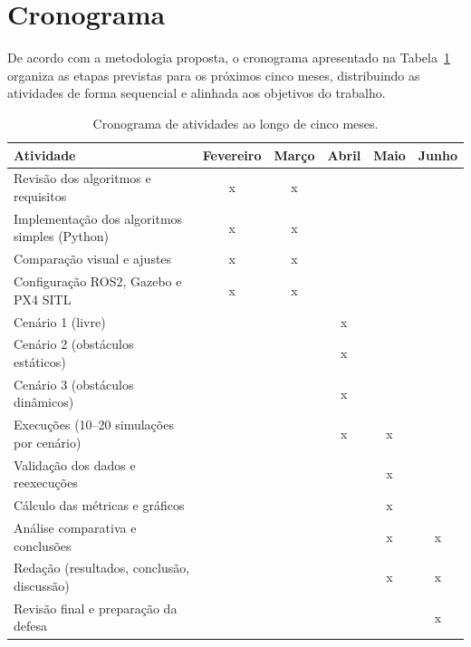 
\section{Cronograma}

De acordo com a metodologia proposta, o cronograma apresentado na Tabela~\ref{tab:cronograma} organiza as etapas previstas para os próximos cinco meses, distribuindo as atividades de forma sequencial e alinhada aos objetivos do trabalho.

\begin{table}[!ht]
\centering
\small %
\caption{Cronograma de atividades ao longo de cinco meses.}
\label{tab:cronograma}
\renewcommand{\arraystretch}{1.2}
\begin{tabular}{|p{6.5cm}|c|c|c|c|c|}
\hline
\textbf{Atividade} & \textbf{Fevereiro} & \textbf{Março} & \textbf{Abril} & \textbf{Maio}  & \textbf{Junho} \\ \hline

Revisão dos algoritmos e requisitos             & x & x &   &   &   \\ \hline
Implementação dos algoritmos simples (Python)   & x & x &   &   &   \\ \hline
Comparação visual e ajustes                     & x & x &   &   &   \\ \hline
Configuração ROS2, Gazebo e PX4 SITL            & x & x &   &   &   \\ \hline
Cenário 1 (livre)                               &   &   & x &   &   \\ \hline
Cenário 2 (obstáculos estáticos)                &   &   & x &   &   \\ \hline
Cenário 3 (obstáculos dinâmicos)                &   &   & x &   &   \\ \hline
Execuções (10--20 simulações por cenário)       &   &   & x & x &   \\ \hline
Validação dos dados e reexecuções               &   &   &   & x &   \\ \hline
Cálculo das métricas e gráficos                 &   &   &   & x &   \\ \hline
Análise comparativa e conclusões                &   &   &   & x & x \\ \hline
Redação (resultados, conclusão, discussão)      &   &   &   & x & x \\ \hline
Revisão final e preparação da defesa            &   &   &   &   & x \\ \hline

\end{tabular}
\end{table}



